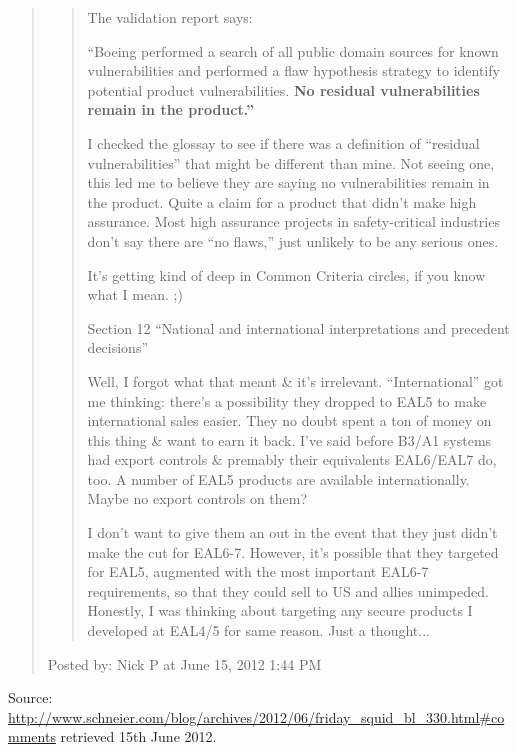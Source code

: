 \documentclass[a4paper]{article}
\begin{document}
\begin{quote}
\begin{quotation}
The validation report says:

``Boeing performed a search of all public domain sources for known vulnerabilities and performed a
flaw hypothesis strategy to identify potential product vulnerabilities. \textbf{No residual
vulnerabilities remain in the product.''}

I checked the glossay to see if there was a definition of ``residual vulnerabilities'' that might be
different than mine. Not seeing one, this led me to believe they are saying no vulnerabilities
remain in the product. Quite a claim for a product that didn't make high assurance. Most high
assurance projects in safety-critical industries don't say there are ``no flaws,'' just unlikely to
be any serious ones.

It's getting kind of deep in Common Criteria circles, if you know what I mean. ;)

Section 12 ``National and international interpretations and precedent decisions''

Well, I forgot what that meant \& it's irrelevant. ``International'' got me thinking: there's a
possibility they dropped to EAL5 to make international sales easier. They no doubt spent a ton of
money on this thing \& want to earn it back. I've said before B3/A1 systems had export controls \&
premably their equivalents EAL6/EAL7 do, too. A number of EAL5 products are available
internationally. Maybe no export controls on them?

I don't want to give them an out in the event that they just didn't make the cut for EAL6-7.
However, it's possible that they targeted for EAL5, augmented with the most important EAL6-7
requirements, so that they could sell to US and allies unimpeded. Honestly, I was thinking about
targeting any secure products I developed at EAL4/5 for same reason. Just a thought...
\end{quotation}
Posted by: Nick P at June 15, 2012 1:44 PM
\end{quote}
Source: \url{http://www.schneier.com/blog/archives/2012/06/friday_squid_bl_330.html#comments}
retrieved 15th June 2012.
\medskip
\end{document}
